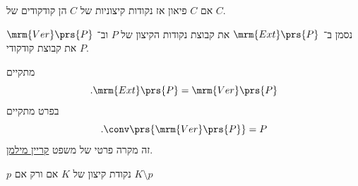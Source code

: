 \documentclass[a4paper,10pt,twoside,openany]{book}
\begin{document}
\begin{proposition}
אם
$C$
פיאון אז נקודות קיצוניות של
$C$
הן קודקודים של
$C$.
\end{proposition}


\begin{notation}
נסמן ב־%
$\mrm{Ext}\prs{P}$
את קבוצת נקודות הקיצון של
$P$
וב־%
$\mrm{Ver}\prs{P}$
את קבוצת קודקודי
$P$.
\end{notation}

\begin{proposition}
מתקיים
\[\text{.} \mrm{Ext}\prs{P} = \mrm{Ver}\prs{P}\]
בפרט מתקיים
\[\text{.} \conv \prs{\mrm{Ver}\prs{P}} = P\]
זה מקרה פרטי של משפט
\href{https://en.wikipedia.org/wiki/Krein%E2%80%93Milman_theorem}{קריין מילמן}.
\end{proposition}

\begin{remark}
$p$
נקודת קיצון
של
$K$
אם ורק אם
$K \setminus p$
\end{remark}
\end{document}

